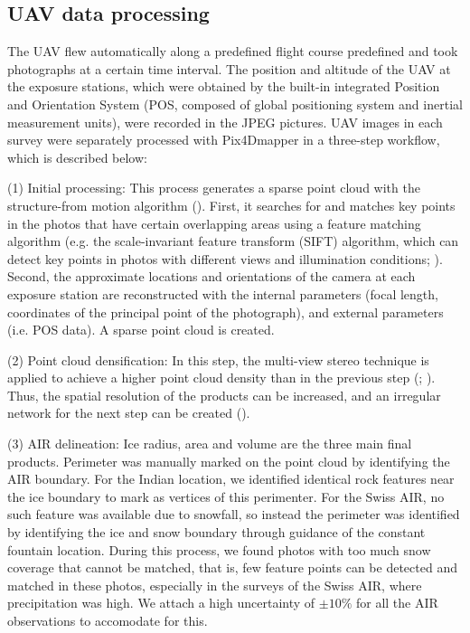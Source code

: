 \documentclass[utf8]{frontiersSCNS} %
\begin{document}
\subsection{UAV data processing} \label{sec:uav}
The UAV flew automatically along a predefined flight course predefined and took photographs at a certain time interval. The position and
altitude of the UAV at the exposure stations, which were obtained by the built-in integrated Position and
Orientation System (POS, composed of global positioning system and inertial measurement units), were recorded in
the JPEG pictures. UAV images in each survey were separately processed with Pix4Dmapper in a three-step workflow,
which is described below:

(1) Initial processing: This process generates a sparse point cloud with the structure-from motion algorithm
(\cite{Turner_2012}). First, it searches for and matches key points in the photos that have certain overlapping
areas using a feature matching algorithm (e.g. the scale-invariant feature transform (SIFT) algorithm, which can
detect key points in photos with different views and illumination conditions; \cite{Lowe_2004}). Second, the
approximate locations and orientations of the camera at each exposure station are reconstructed with the internal
parameters (focal length, coordinates of the principal point of the photograph), and external parameters (i.e. POS
data). A sparse point cloud is created.

(2) Point cloud densification: In this step, the multi-view stereo technique is applied to achieve a higher point
cloud density than in the previous step (\cite{Furukawa_2010}; \cite{Molg_2017}). Thus, the spatial resolution of
the products can be increased, and an irregular network for the next step can be created (\cite{Kung_2011}).

(3) AIR delineation: Ice radius, area and volume are the three main final products. Perimeter was manually marked
on the point cloud by identifying the AIR boundary. For the Indian location, we identified identical rock features
near the ice boundary to mark as vertices of this perimenter. For the Swiss AIR, no such feature was available due
to snowfall, so instead the perimeter was identified by identifying the ice and snow boundary through guidance of
the constant fountain location. During this process, we found photos with too much snow coverage that cannot be matched, that is, few feature
points can be detected and matched in these photos, especially in the surveys of the Swiss AIR, where precipitation
was high. We attach a high uncertainty of $\pm 10 \%$ for all the AIR observations to accomodate for this.
\end{document}
